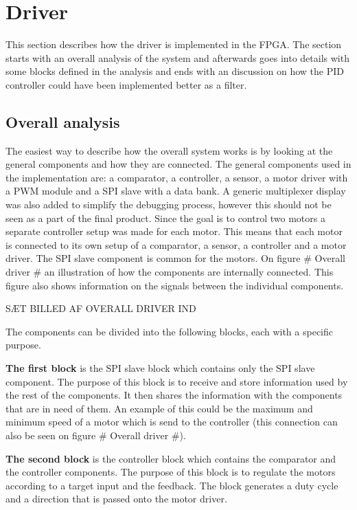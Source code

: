 \section{Driver}
This section describes how the driver is implemented in the FPGA. The section starts with an overall analysis of the system and afterwards goes into details with some blocks defined in the analysis and ends with an discussion on how the PID controller could have been implemented better as a filter.

\subsection{Overall analysis}

The easiest way to describe how the overall system works is by looking at the general components and how they are connected. The general components used in the implementation are: a comparator, a controller, a sensor, a motor driver with a PWM module and a SPI slave with a data bank. A generic multiplexer display was also added to simplify the debugging process, however this should not be seen as a part of the final product.
Since the goal is to control two motors a separate controller setup was made for each motor. This means that each motor is connected to its own setup of a comparator, a sensor, a controller and a motor driver. The SPI slave component is common for the motors.
On figure \# Overall driver \# an illustration of how the components are internally connected. This figure also shows information on the signals between the individual components.

SÆT BILLED AF OVERALL DRIVER IND

The components can be divided into the following blocks, each with a specific purpose. 

\textbf{The first block} is the SPI slave block which contains only the SPI slave component. The purpose of this block is to receive and store information used by the rest of the components. It then shares the information with the components that are in need of them. An example of this could be the maximum and minimum speed of a motor which is send to the controller (this connection can also be seen on figure \# Overall driver \#).

\textbf{The second block} is the controller block which contains the comparator and the controller components. The purpose of this block is to regulate the motors according to a target input and the feedback. The block generates a duty cycle and a direction that is passed onto the motor driver.

